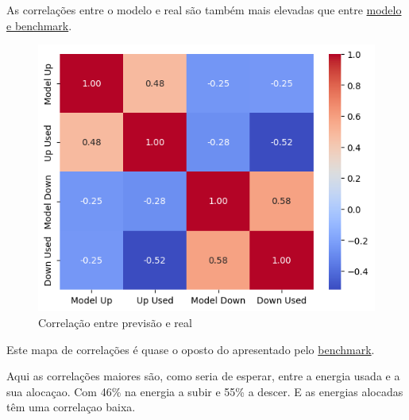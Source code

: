 As correlações entre o modelo e real são também mais elevadas que entre \hyperref[fig:featurecorrelation]{modelo e benchmark}.


\begin{figure}[H]
    \centering
    \includegraphics[width=\textwidth]{plots/heatmap_correlation_pred.png}
    \caption{Correlação entre previsão e real}
    \label{fig:predcorrelation}
  \end{figure}

Este mapa de correlações é quase o oposto do apresentado pelo \hyperref[fig:benchmarkcorr]{benchmark}.\par
Aqui as correlações maiores são, como seria de esperar, entre a energia usada e a sua alocaçao. Com 46\% na energia a subir e 55\% a descer. E as energias alocadas têm uma correlaçao baixa.\par 